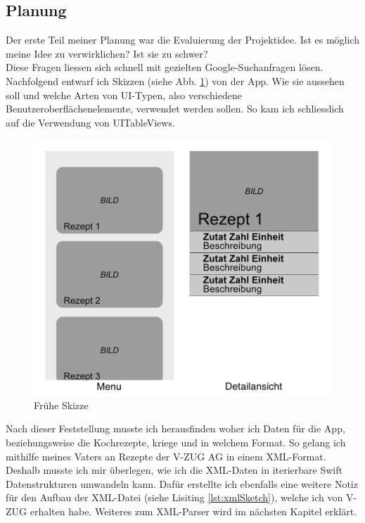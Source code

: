 \documentclass[12pt]{article}
\begin{document}
\subsection{Planung}
Der erste Teil meiner Planung war die Evaluierung der Projektidee. Ist es möglich meine Idee zu verwirklichen? Ist sie zu schwer? \\ Diese Fragen liessen sich schnell mit gezielten Google-Suchanfragen lösen. \\ Nachfolgend entwarf ich Skizzen (siehe Abb. \ref{fig:earlySketch}) von der App. Wie sie aussehen soll und welche Arten von UI-Typen, also verschiedene Benutzeroberflächenelemente, verwendet werden sollen. So kam ich schliesslich auf die Verwendung von UITableViews. 
\begin{figure}
    \includegraphics[width=\linewidth]{pictures/Sketch.png}
    \caption{Frühe Skizze}
    \label{fig:earlySketch}
\end{figure}
Nach dieser Feststellung musste ich herausfinden woher ich Daten für die App, beziehungsweise die Kochrezepte, kriege und in welchem Format. So gelang ich mithilfe meines Vaters an Rezepte der V-ZUG AG in einem XML-Format. Deshalb musste ich mir überlegen, wie ich die XML-Daten in iterierbare Swift Datenstrukturen umwandeln kann. Dafür erstellte ich ebenfalls eine weitere Notiz für den Aufbau der XML-Datei (siehe Lisiting \ref{lst:xmlSketch}), welche ich von V-ZUG erhalten habe. Weiteres zum XML-Parser wird im nächsten Kapitel erklärt. 
\end{document}
